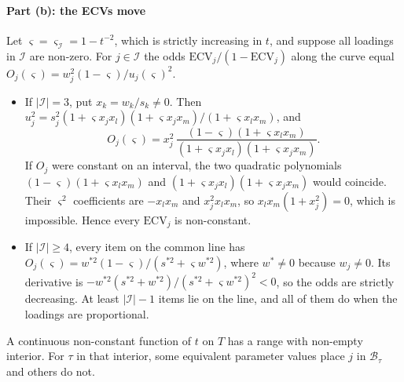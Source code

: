 \paragraph{Part (b): the ECVs move}
Let $\varsigma=\varsigma_{\mathcal I}=1-t^{-2}$, which is strictly increasing in $t$, and suppose all loadings in $\mathcal I$ are non-zero. For $j\in\mathcal I$ the odds $\mathrm{ECV}_j/(1-\mathrm{ECV}_j)$ along the curve equal $O_j(\varsigma)=w_j^2(1-\varsigma)/u_j(\varsigma)^2$.
\begin{itemize}
  \item If $|\mathcal I|=3$, put $x_k=w_k/s_k\neq0$. Then $u_j^2=s_j^2(1+\varsigma x_jx_l)(1+\varsigma x_jx_m)/(1+\varsigma x_lx_m)$, and
  \[
    O_j(\varsigma)=x_j^2\,\frac{(1-\varsigma)(1+\varsigma x_lx_m)}{(1+\varsigma x_jx_l)(1+\varsigma x_jx_m)} .
  \]
  If $O_j$ were constant on an interval, the two quadratic polynomials $(1-\varsigma)(1+\varsigma x_lx_m)$ and $(1+\varsigma x_jx_l)(1+\varsigma x_jx_m)$ would coincide. Their $\varsigma^2$ coefficients are $-x_lx_m$ and $x_j^2x_lx_m$, so $x_lx_m(1+x_j^2)=0$, which is impossible. Hence every $\mathrm{ECV}_j$ is non-constant.
  \item If $|\mathcal I|\ge4$, every item on the common line has $O_j(\varsigma)=w^{*2}(1-\varsigma)/(s^{*2}+\varsigma w^{*2})$, where $w^*\neq0$ because $w_j\neq0$. Its derivative is $-w^{*2}(s^{*2}+w^{*2})/(s^{*2}+\varsigma w^{*2})^2<0$, so the odds are strictly decreasing. At least $|\mathcal I|-1$ items lie on the line, and all of them do when the loadings are proportional.
\end{itemize}
A continuous non-constant function of $t$ on $T$ has a range with non-empty interior. For $\tau$ in that interior, some equivalent parameter values place $j$ in $\mathcal B_\tau$ and others do not.

